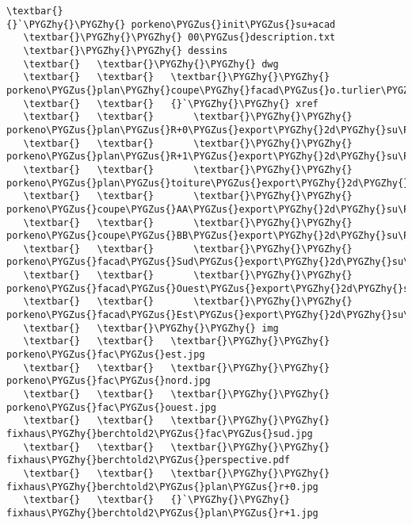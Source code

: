 \documentclass[a4paper,12pt,french]{sphinxmanual}
\def\PYGZus{\char`\_}
\def\PYGZhy{\char`\-}
\begin{document}
\begin{Verbatim}[commandchars=\\\{\}]
\textbar{}
{}`\PYGZhy{}\PYGZhy{} porkeno\PYGZus{}init\PYGZus{}su+acad
   \textbar{}\PYGZhy{}\PYGZhy{} 00\PYGZus{}description.txt
   \textbar{}\PYGZhy{}\PYGZhy{} dessins
   \textbar{}   \textbar{}\PYGZhy{}\PYGZhy{} dwg
   \textbar{}   \textbar{}   \textbar{}\PYGZhy{}\PYGZhy{} porkeno\PYGZus{}plan\PYGZhy{}coupe\PYGZhy{}facad\PYGZus{}o.turlier\PYGZus{}25mai09\PYGZus{}12h00.dwg
   \textbar{}   \textbar{}   {}`\PYGZhy{}\PYGZhy{} xref
   \textbar{}   \textbar{}       \textbar{}\PYGZhy{}\PYGZhy{} porkeno\PYGZus{}plan\PYGZus{}R+0\PYGZus{}export\PYGZhy{}2d\PYGZhy{}su\PYGZus{}o.turlier\PYGZus{}25mai.dwg
   \textbar{}   \textbar{}       \textbar{}\PYGZhy{}\PYGZhy{} porkeno\PYGZus{}plan\PYGZus{}R+1\PYGZus{}export\PYGZhy{}2d\PYGZhy{}su\PYGZus{}o.turlier\PYGZus{}25mai.dwg
   \textbar{}   \textbar{}       \textbar{}\PYGZhy{}\PYGZhy{} porkeno\PYGZus{}plan\PYGZus{}toiture\PYGZus{}export\PYGZhy{}2d\PYGZhy{}su\PYGZus{}o.turlier\PYGZus{}25mai.dwg
   \textbar{}   \textbar{}       \textbar{}\PYGZhy{}\PYGZhy{} porkeno\PYGZus{}coupe\PYGZus{}AA\PYGZus{}export\PYGZhy{}2d\PYGZhy{}su\PYGZus{}o.turlier\PYGZus{}25mai.dwg
   \textbar{}   \textbar{}       \textbar{}\PYGZhy{}\PYGZhy{} porkeno\PYGZus{}coupe\PYGZus{}BB\PYGZus{}export\PYGZhy{}2d\PYGZhy{}su\PYGZus{}o.turlier\PYGZus{}25mai.dwg
   \textbar{}   \textbar{}       \textbar{}\PYGZhy{}\PYGZhy{} porkeno\PYGZus{}facad\PYGZus{}Sud\PYGZus{}export\PYGZhy{}2d\PYGZhy{}su\PYGZus{}o.turlier\PYGZus{}25mai.dwg
   \textbar{}   \textbar{}       \textbar{}\PYGZhy{}\PYGZhy{} porkeno\PYGZus{}facad\PYGZus{}Ouest\PYGZus{}export\PYGZhy{}2d\PYGZhy{}su\PYGZus{}o.turlier\PYGZus{}25mai.dwg
   \textbar{}   \textbar{}       \textbar{}\PYGZhy{}\PYGZhy{} porkeno\PYGZus{}facad\PYGZus{}Est\PYGZus{}export\PYGZhy{}2d\PYGZhy{}su\PYGZus{}o.turlier\PYGZus{}25mai.dwg
   \textbar{}   \textbar{}\PYGZhy{}\PYGZhy{} img
   \textbar{}   \textbar{}   \textbar{}\PYGZhy{}\PYGZhy{} porkeno\PYGZus{}fac\PYGZus{}est.jpg
   \textbar{}   \textbar{}   \textbar{}\PYGZhy{}\PYGZhy{} porkeno\PYGZus{}fac\PYGZus{}nord.jpg
   \textbar{}   \textbar{}   \textbar{}\PYGZhy{}\PYGZhy{} porkeno\PYGZus{}fac\PYGZus{}ouest.jpg
   \textbar{}   \textbar{}   \textbar{}\PYGZhy{}\PYGZhy{} fixhaus\PYGZhy{}berchtold2\PYGZus{}fac\PYGZus{}sud.jpg
   \textbar{}   \textbar{}   \textbar{}\PYGZhy{}\PYGZhy{} fixhaus\PYGZhy{}berchtold2\PYGZus{}perspective.pdf
   \textbar{}   \textbar{}   \textbar{}\PYGZhy{}\PYGZhy{} fixhaus\PYGZhy{}berchtold2\PYGZus{}plan\PYGZus{}r+0.jpg
   \textbar{}   \textbar{}   {}`\PYGZhy{}\PYGZhy{} fixhaus\PYGZhy{}berchtold2\PYGZus{}plan\PYGZus{}r+1.jpg

\end{Verbatim}
\end{document}
